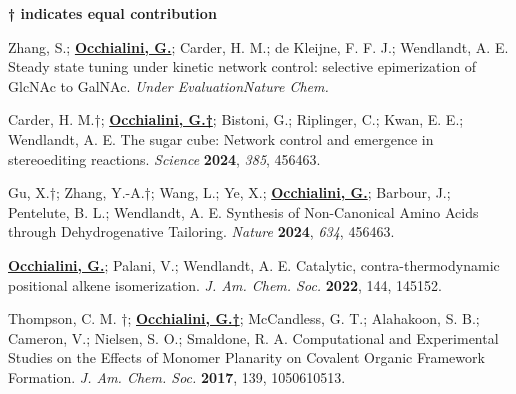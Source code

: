 
\begin{rSection}{}

  \textbf{† indicates equal contribution}





  Zhang, S.; \underline{\textbf{Occhialini, G.}}; Carder, H. M.; de Kleijne, F. F. J.; Wendlandt, A. E. Steady state tuning under kinetic network control: selective epimerization of GlcNAc to GalNAc. \textit{Under Evaluation\textemdash{}Nature Chem.}

  Carder, H. M.†; \underline{\textbf{Occhialini, G.†}}; Bistoni, G.; Riplinger, C.; Kwan, E. E.; Wendlandt, A. E. The sugar cube: Network control and emergence in stereoediting reactions. \textit{Science} \textbf{2024}, \textit{385}, 456\textemdash{}463.
  
  Gu, X.†; Zhang, Y.-A.†; Wang, L.; Ye, X.; \underline{\textbf{Occhialini, G.}}; Barbour, J.; Pentelute, B. L.; Wendlandt, A. E. Synthesis of Non-Canonical Amino Acids through Dehydrogenative Tailoring. \textit{Nature} \textbf{2024}, \textit{634}, 456\textemdash{}463.
  
  \underline{\textbf{Occhialini, G.}}; Palani, V.; Wendlandt, A. E. Catalytic, contra-thermodynamic positional alkene isomerization. \textit{J. Am. Chem. Soc.} \textbf{2022}, 144, 145\textemdash{}152.
  
  Thompson, C. M. †; \underline{\textbf{Occhialini, G.†}}; McCandless, G. T.; Alahakoon, S. B.; Cameron, V.; Nielsen, S. O.; Smaldone, R. A. Computational and Experimental Studies on the Effects of Monomer Planarity on Covalent Organic Framework Formation. \textit{J. Am. Chem. Soc.} \textbf{2017}, 139, 10506\textemdash{}10513.
  

\end{rSection}
